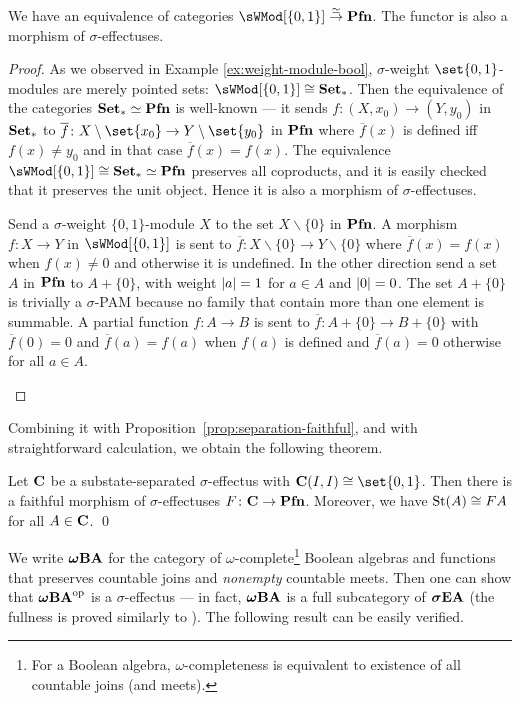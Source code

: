 \documentclass[%
	submission,
copyright,creativecommons,UKenglish]{eptcs}
\begin{document}
\begin{proposition}\label{prop:equiv-pfn-wmod}
  We have an equivalence of categories
  $\sWMod[\{0,1\}]\overset\simeq\to\Pfn$.
  The functor is also a morphism of $\sigma$-effectuses.
\end{proposition}
\begin{proof}
  As we observed in Example \ref{ex:weight-module-bool},
  $\sigma$-weight $\set{0,1}$-modules are merely pointed sets:
  $\sWMod[\{0,1\}]\cong \pSet$.
  Then the equivalence of the categories
  $\mathbf{Set}_{*}\simeq \mathbf{Pfn}$ is well-known ---
  it sends $f\colon (X,x_0)\to (Y,y_0)$ in $\mathbf{Set}_{*}$
  to $\overline{f}\colon X\setminus\set{x_0}\to Y\setminus\set{y_0}$
  in $\mathbf{Pfn}$ where $\overline{f}(x)$ is defined iff $f(x)\neq y_0$
  and in that case $\overline{f}(x)=f(x)$.
  The equivalence $\sWMod[\{0,1\}]\cong\pSet\simeq \Pfn$
  preserves all coproducts, and it is easily checked that
  it preserves the unit object. Hence it is also
  a morphism of $\sigma$-effectuses.
  \begin{Auxproof}
  Send a $\sigma$-weight $\{0,1\}$-module $X$ to the set
  $X\backslash \{0\}$ in $\mathbf{Pfn}$. A morphism $f:X\rightarrow Y$ in
  $\sWMod[\{0,1\}]$ is sent to
  $\overline{f}:X\backslash \{0\}\rightarrow Y\backslash \{0\}$ where
  $\overline{f}(x) = f(x)$ when $f(x)\neq 0$ and otherwise it is
  undefined.
  In the other direction send a set $A$ in $\mathbf{Pfn}$ to $A+\{0\}$,
  with weight $\lvert a\rvert=1$ for $a\in A$ and $\lvert0\rvert=0$.
  The set $A+\{0\}$ is trivially a $\sigma$-PAM because no family
  that contain more than one element is summable.
  A partial function $f\colon A\rightarrow B$ is sent to
  $\overline{f}:A+\{0\}\rightarrow B+\{0\}$ with $\overline{f}(0) = 0$
  and $\overline{f}(a) = f(a)$ when $f(a)$ is defined and
  $\overline{f}(a)=0$ otherwise for all $a\in A$.
  \end{Auxproof}
\end{proof}

Combining it with Proposition~\ref{prop:separation-faithful},
and with straightforward calculation,
we obtain the following theorem.

\begin{theorem}
Let $\mathbf{C}$ be a substate-separated $\sigma$-effectus
with $\catC(I,I)\cong\set{0,1}$.
Then there is a faithful morphism of $\sigma$-effectuses
$F\colon\mathbf{C}\to \mathbf{Pfn}$.
Moreover, we have $\mathrm{St}(A)\cong FA$ for all $A\in\mathbf{C}$.
\qed
\end{theorem}

We write $\boldsymbol{\omega}\mathbf{BA}$ for the category of
$\omega$-complete\footnote{%
For a Boolean algebra, $\omega$-completeness
is equivalent to
existence of all countable joins (and meets).}
Boolean algebras
and functions that preserves countable joins
and \emph{nonempty} countable meets.
Then one can show that $\boldsymbol{\omega}\mathbf{BA}^{\mathrm{op}}$
is a $\sigma$-effectus
--- in fact, $\boldsymbol{\omega}\mathbf{BA}$ is a full subcategory of $\boldsymbol{\sigma}\mathbf{EA}$
(the fullness is proved similarly to \cite[Lemma 6.5.18]{Cho2019PhD}).
The following result can be easily verified.
\end{document}
